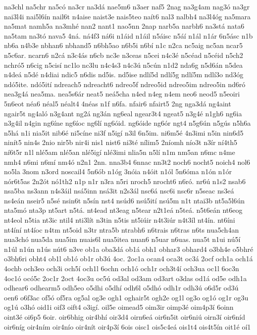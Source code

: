 {na3chl
na5chr
na5có
na3cr
na3dá
nae5m6
n3aer
naf5
2nag
na3g4am
nag3ó
na3gr
nai3l4i
nai5l6ín
nail6t
n4aise
naist3e
nais5teo
naít6
nal3
nalbh4
na3l4óg
na5mara
na5mat
namh5a
na3mhé
nan2
nant1
nao5nn
2nap
narb5a
narbh6
na3stá
nata6
na5tam
na3tó
nava5
4ná.
ná4f3
ná6i
n1áid
n1áil
n5áisc
n5áí
n1ál
n1ár
6n5ásc
n1b
nb6a
n4b3e
nbhan6
nbhand5
n6bh5ao
n6b5i
n6bí
n1c
n2ca
nc5aig
nc5an
ncar5
n5c6ar.
ncarn6
n2cá
n3c4ás
n6cb
nc3e
n3ceas
n5cei
n4c3é
n5céad
n5céid
n5ch2
nchró5
n6cig
n5cisí
nc1lo
nc3lu
n4c4s3
n4c3ú
n5cún
n1d2
nda6g
n5d6án
n5dea
n4deá
n5dé
n4diai
ndic5
n6dis
nd5is.
nd5ise
ndlí5d
ndlí5g
ndlí5m
ndlí3o
nd3óg
ndó5ite.
ndó5ití
ndreach5
ndreacht6
ndreo5f
ndreo5id
ndreo5im
ndreo5in
nd6ró
nea3g4á
nea5ma.
nea5s6ár
neat5
neá5cha
n4ed
n4eg
n4em
neo6
neod5
n5eoiri
5n6eot
néa6
néal5
néalt4
4néas
n1f
n6fa.
nfair6
nfairt5
2ng
nga3dá
ng4aint
ngair5t
ng4aló
n3g4ant
ng2á
ng3án
ng6eal
ngear3t4
ngeat5
n3g4é
n1gh6
ng6ia
n3g4il
n4gin
ng6íne
ng6íoc
ng6lí
ng6óid.
ng6óide
ng6ór
ngt4
n5g6ún
n5gús
n5h6a
n5há
n1i
nia5it
nib6é
ni5cíne
ni3f
n5igí
n3il
6n5im.
ni6m5é
4n3imi
n5in
nin6d5
ninít5
nin4s
2nio
nir5b
nir4i
nis1
nist6
ni3té
nílim5
2níomh
nío3t
n3ír
ní4th5
ní6t5r
n1l
nlé5am
nlé5an
nlé5igí
nlé3imi
nlia5n
n5lí
n1m
nm5an
n6mc
n4me
nmh4
n6mi
n6mí
nm4ó
n2n1
2nn.
nna3b4
6nnac
nn3t2
noch6
nocht5
noich4
nol6
no5la
3nom
n3ord
noscail4
5n6ób
n1óg
3nóia
n4óit
n1ól
5n6óma
n1ón
n1ór
nór6t5as
2n2ót
nó1th2
n1p
n1r
n3ra
n5ri
nroch5
nrocht6
n6ró.
nr6ú
n1s2
nsab6
nsa5ba
ns3ann
n4s3áil
nsá5inn
nsá3it
n2s3ál
nsc6á
nsc6i
nsc6r
n5seac
ns3eá
ns4eán
nseir5
n5sé
nsin6t
n5sín
nst4
nsúd6
nsú5ití
nsú5m
n1t
ntai3b
nt5a5l6ún
nta5mó
nta3p
nt5art
n5tá.
nt4ead
nt3eag
n5tear
n2t1eá
n5teá.
n5t6eán
nt6eog
nt4eol
n5tia
nt3ic
ntil4
nti3lít
n3tin
n5tis
nt5iúir
n4t3iúr
n4t3íl
nt4ín.
nt6íni
nt4íní
nt4íoc
n4tm
nt5oid
n3tr
ntra5b
ntrabh6
n6trais
n6tras
n6ts
nua5ch4an
nua3chó
nua5da
nua5im
nuais6l
nua5itea
nuan6
n5uar
n6uas.
nua5t
n1ui
nú5í
n1úl
n1ún
n1ús
nút6
n3ve
ob1a
oba3dá
ob1á
obh1
obhar3
obhard4
o3bh4e
o5bhré
o3bh6ri
obht4
ob1l
ob1ó
ob1r
ob3ú
4oc.
2oc1a
ocan4
oca3t
oc3á
2ocf
och1a
och1á
4ochb
och3eo
och3i
och5í
och1l
6ochn
och1ó
och1r
och3t4í
och3ua
oc1l
6oc3n
4oc1ó
ocó5c
2oc1r
2oct
4oc3u
oc5ú
od3al
od3am
od3art
o3das
od1á
od5e
odh1a
odhear6
odhearm5
odh5eo
o5dhi
o5dhí
odh6l
o5dhó
odh1r
odh3ú
o6d5r
od3ú
oen6
o6f3ac
of5ó
of5ra
og5al
og3e
ogh1
oghair5t
ogh2e
og1l
og3o
og1ó
og1r
og3u
og1ú
o3hó
oid1i
oif3
oift4
o3igí.
oil5e
oimead5
oim3ir
oimp3é
oim4p3í
6oinn
oint3é
oi6p5
6oir.
oir6bhig
oir4bhí
oir3d4
oirn6eá
oir6n5it
oir6niú
oirn3í
oir6níd
oir6níg
oir4ním
oir4nío
oir4nít
oir4p3í
6ois
oisc1
ois5c4eá
ois1t4
ois4t5ín
oit1é
oí1
}
